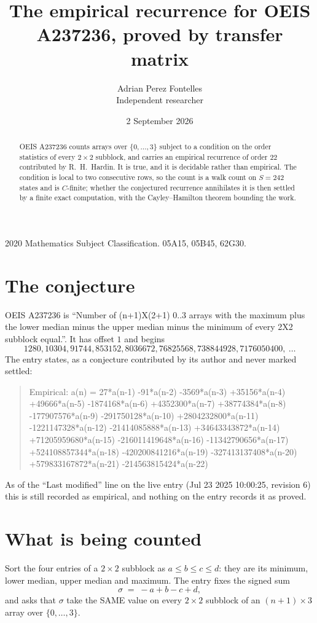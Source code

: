 \documentclass[11pt,a4paper]{article}
\title{The empirical recurrence for OEIS A237236, proved by transfer matrix}
\author{Adrian Perez Fontelles\\ \small Independent researcher}
\date{2 September 2026}
\theoremstyle{plain}
\theoremstyle{definition}
\begin{document}
\maketitle

\begin{abstract}
OEIS A237236 counts arrays over $\{0,\dots,3\}$ subject to a condition on the order
statistics of every $2\times2$ subblock, and carries an empirical recurrence of order
$22$ contributed by R.~H.~Hardin. It is true, and it is decidable rather than empirical.
The condition is local to two consecutive rows, so the count is a walk count on $S=242$
states and is $C$-finite; whether the conjectured recurrence annihilates it is then settled by
a finite exact computation, with the Cayley--Hamilton theorem bounding the work.
\end{abstract}

\noindent\small 2020 Mathematics Subject Classification. 05A15, 05B45, 62G30.\normalsize

\section{The conjecture}

OEIS A237236 is ``Number of (n+1)X(2+1) 0..3 arrays with the maximum plus the lower median minus the upper median minus the minimum of every 2X2 subblock equal.''. It has offset $1$ and begins
\[
1280, 10304, 91744, 853152, 8036672, 76825568, 738844928, 7176050400,\ \dots
\]
The entry states, as a conjecture contributed by its author and never marked settled:
\begin{quote}
Empirical: a(n) = 27*a(n-1) -91*a(n-2) -3569*a(n-3) +35156*a(n-4) +49666*a(n-5) -1874168*a(n-6) +4352300*a(n-7) +38774384*a(n-8) -177907576*a(n-9) -291750128*a(n-10) +2804232800*a(n-11) -1221147328*a(n-12) -21414085888*a(n-13) +34643343872*a(n-14) +71205959680*a(n-15) -216011419648*a(n-16) -11342790656*a(n-17) +524108857344*a(n-18) -420200841216*a(n-19) -327413137408*a(n-20) +579833167872*a(n-21) -214563815424*a(n-22)
\end{quote}
As of the ``Last modified'' line on the live entry (Jul 23 2025 10:00:25, revision 6) this is still
recorded as empirical, and nothing on the entry records it as proved.

\section{What is being counted}

Sort the four entries of a $2\times2$ subblock as $a\le b\le c\le d$: they
are its minimum, lower median, upper median and maximum. The entry fixes the signed sum
\[
\sigma\;=\;-a+b-c+d,
\]
and asks that $\sigma$ take the SAME value on every $2\times2$ subblock of an
$(n+1)\times3$ array over $\{0,\dots,3\}$.
\end{document}
